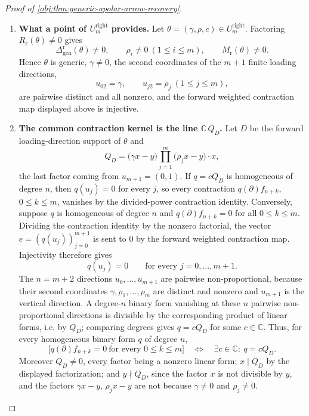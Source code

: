 \documentclass[11pt]{article}
\begin{document}
\begin{proof}[Proof of \cref{obj:thm:generic-apolar-arrow-recovery}]
\begin{enumerate}
\item \textbf{What a point of \(U^{\mathrm{right}}_m\) provides.}  Let \(\theta=(\gamma,\rho,c)\in U^{\mathrm{right}}_m\).  Factoring \(R_{\mathrm r}(\theta)\ne0\) gives
\[
\Delta_{\mathrm{gen}}^{\mathrm r}(\theta)\ne0,
\qquad \rho_i\ne0\ (1\le i\le m),
\qquad M_{\mathrm r}(\theta)\ne0 .
\]
Hence \(\theta\) is generic, \(\gamma\ne0\), the second coordinates of the \(m+1\) finite loading directions,
\[
u_{02}=\gamma,
\qquad
u_{j2}=\rho_j\ (1\le j\le m),
\]
are pairwise distinct and all nonzero, and the forward weighted contraction map displayed above is injective.

\item \textbf{The common contraction kernel is the line \(\mathbb C\,Q_D\).}  Let \(D\) be the forward loading-direction support of \(\theta\) and
\[
Q_D=\bigl(\gamma x-y\bigr)\prod_{j=1}^{m}\bigl(\rho_jx-y\bigr)\cdot x,
\]
the last factor coming from \(u_{m+1}=(0,1)\).  If \(q=cQ_D\) is homogeneous of degree \(n\), then \(q(u_j)=0\) for every \(j\), so every contraction \(q(\partial)f_{n+k}\), \(0\le k\le m\), vanishes by the divided-power contraction identity.  Conversely, suppose \(q\) is homogeneous of degree \(n\) and \(q(\partial)f_{n+k}=0\) for all \(0\le k\le m\).  Dividing the contraction identity by the nonzero factorial, the vector \(e=(q(u_j))_{j=0}^{m+1}\) is sent to \(0\) by the forward weighted contraction map.  Injectivity therefore gives
\[
q(u_j)=0\qquad\text{for every }j=0,\ldots,m+1 .
\]
The \(n=m+2\) directions \(u_0,\ldots,u_{m+1}\) are pairwise non-proportional, because their second coordinates \(\gamma,\rho_1,\ldots,\rho_m\) are distinct and nonzero and \(u_{m+1}\) is the vertical direction.  A degree-\(n\) binary form vanishing at these \(n\) pairwise non-proportional directions is divisible by the corresponding product of linear forms, i.e. by \(Q_D\); comparing degrees gives \(q=cQ_D\) for some \(c\in\mathbb C\).  Thus, for every homogeneous binary form \(q\) of degree \(n\),
\[
\bigl[q(\partial)f_{n+k}=0\ \text{for every }0\le k\le m\bigr]
\quad\Longleftrightarrow\quad
\exists c\in\mathbb C:\ q=cQ_D .
\]
Moreover \(Q_D\ne0\), every factor being a nonzero linear form; \(x\mid Q_D\) by the displayed factorization; and \(y\nmid Q_D\), since the factor \(x\) is not divisible by \(y\), and the factors \(\gamma x-y\), \(\rho_jx-y\) are not because \(\gamma\ne0\) and \(\rho_j\ne0\).


\end{enumerate}
\end{proof}
\end{document}
